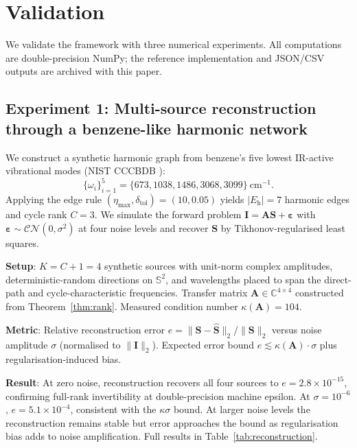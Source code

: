 \documentclass[11pt,twocolumn,a4paper]{article}
\theoremstyle{definition}
\theoremstyle{remark}
\newcommand{\Cmat}{\mathbf{A}}
\newcommand{\Ivec}{\mathbf{I}}
\newcommand{\Svec}{\mathbf{S}}
\newcommand{\HarmSet}{E_{\mathrm{h}}}
\begin{document}
\section{Validation}
\label{sec:validation}

We validate the framework with three numerical experiments. All computations are double-precision NumPy; the reference implementation and JSON/CSV outputs are archived with this paper.

\subsection{Experiment 1: Multi-source reconstruction through a benzene-like harmonic network}
\label{sec:exp_reconstruction}

We construct a synthetic harmonic graph from benzene's five lowest IR-active vibrational modes (NIST CCCBDB \citep{cccbdb}):
\begin{equation}
\{\omega_i\}_{i=1}^5 = \{673, 1038, 1486, 3068, 3099\}~\mathrm{cm}^{-1}.
\end{equation}
Applying the edge rule $(\eta_{\max}, \delta_{\mathrm{tol}}) = (10, 0.05)$ yields $|\HarmSet| = 7$ harmonic edges and cycle rank $C = 3$. We simulate the forward problem $\Ivec = \Cmat\Svec + \boldsymbol{\varepsilon}$ with $\boldsymbol{\varepsilon} \sim \mathcal{CN}(0, \sigma^2)$ at four noise levels and recover $\Svec$ by Tikhonov-regularised least squares.

\textbf{Setup}: $K = C + 1 = 4$ synthetic sources with unit-norm complex amplitudes, deterministic-random directions on $\mathbb{S}^2$, and wavelengths placed to span the direct-path and cycle-characteristic frequencies. Transfer matrix $\Cmat \in \mathbb{C}^{4 \times 4}$ constructed from Theorem~\ref{thm:rank}. Measured condition number $\kappa(\Cmat) = 104$.

\textbf{Metric}: Relative reconstruction error $e = \|\Svec - \hat{\Svec}\|_2 / \|\Svec\|_2$ versus noise amplitude $\sigma$ (normalised to $\|\Ivec\|_2$). Expected error bound $e \lesssim \kappa(\Cmat) \cdot \sigma$ plus regularisation-induced bias.

\textbf{Result}: At zero noise, reconstruction recovers all four sources to $e = 2.8 \times 10^{-15}$, confirming full-rank invertibility at double-precision machine epsilon. At $\sigma = 10^{-6}$, $e = 5.1\times 10^{-4}$, consistent with the $\kappa\sigma$ bound. At larger noise levels the reconstruction remains stable but error approaches the bound as regularisation bias adds to noise amplification. Full results in Table~\ref{tab:reconstruction}.
\end{document}
